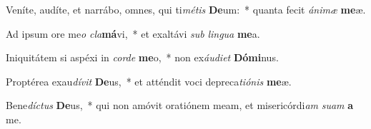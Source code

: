 \item Veníte, audíte, et narrábo, omnes, qui ti\textit{mé}\textit{tis} \textbf{De}um:~* quanta fecit \textit{á}\textit{ni}\textit{mæ} \textbf{me}æ.
\item Ad ipsum ore me\textit{o} \textit{cla}\textbf{má}vi,~* et exaltávi \textit{sub} \textit{lin}\textit{gua} \textbf{me}a.
\item Iniquitátem si aspéxi in \textit{cor}\textit{de} \textbf{me}o,~* non ex\textit{áu}\textit{di}\textit{et} \textbf{Dó}\textbf{mi}nus.
\item Proptérea exau\textit{dí}\textit{vit} \textbf{De}us,~* et atténdit voci depreca\textit{ti}\textit{ó}\textit{nis} \textbf{me}æ.
\item Bene\textit{díc}\textit{tus} \textbf{De}us,~* qui non amóvit oratiónem meam, et misericórdi\textit{am} \textit{su}\textit{am} \textbf{a} me.
